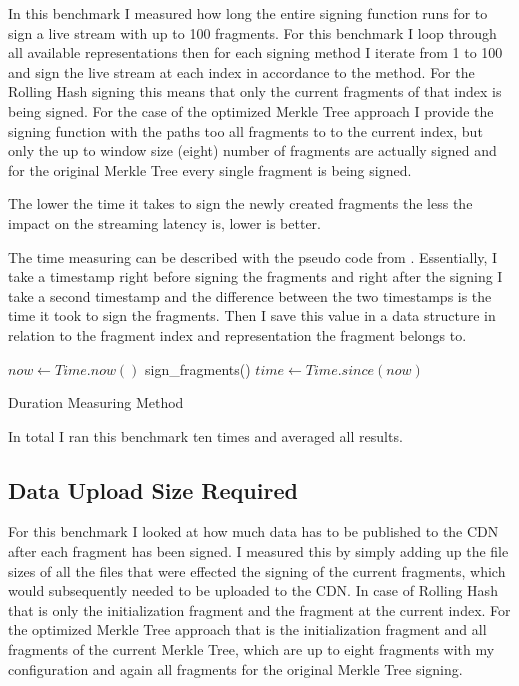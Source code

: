 In this benchmark I measured how long the entire signing function runs for to sign a live stream with up to 100 fragments. For this benchmark I loop through all available representations then for each signing method I iterate from 1 to 100 and sign the live stream at each index in accordance to the method. For the Rolling Hash signing this means that only the current fragments of that index is being signed. For the case of the optimized Merkle Tree approach I provide the signing function with the paths too all fragments to to the current index, but only the up to window size (eight) number of fragments are actually signed and for the original Merkle Tree every single fragment is being signed.

The lower the time it takes to sign the newly created fragments the less the impact on the streaming latency is, lower is better.

The time measuring can be described with the pseudo code from . Essentially, I take a timestamp right before signing the fragments and right after the signing I take a second timestamp and the difference between the two timestamps is the time it took to sign the fragments. Then I save this value in a data structure in relation to the fragment index and representation the fragment belongs to.

\begin{algorithm}[H]
    \begin{algorithmic}[1]
        \State $now \gets Time.now()$
        \State sign\_fragments()
        \State $time \gets Time.since(now)$        
    \end{algorithmic}
    \caption{Duration Measuring Method}
    \label{alg:time-measure}
\end{algorithm}

In total I ran this benchmark ten times and averaged all results.

\subsection{Data Upload Size Required}

For this benchmark I looked at how much data has to be published to the CDN after each fragment has been signed. I measured this by simply adding up the file sizes of all the files that were effected the signing of the current fragments, which would subsequently needed to be uploaded to the CDN. In case of Rolling Hash that is only the initialization fragment and the fragment at the current index. For the optimized Merkle Tree approach that is the initialization fragment and all fragments of the current Merkle Tree, which are up to eight fragments with my configuration and again all fragments for the original Merkle Tree signing.

